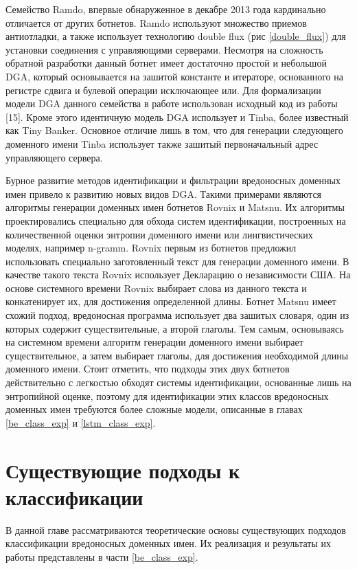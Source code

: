 Семейство Ramdo, впервые обнаруженное в декабре 2013 года кардинально отличается от других ботнетов. Ramdo используют множество приемов антиотладки, а также использует технологию double flux (рис \ref{double_flux}) для установки соединения с управляющими серверами. Несмотря на сложность обратной разработки данный ботнет имеет достаточно простой и небольшой DGA, который основывается на зашитой константе и итераторе, основанного на регистре сдвига и булевой операции исключающее или. Для формализации модели DGA данного семейства в работе использован исходный код из работы [15]. Кроме этого идентичную модель DGA использует и Tinba, более известный как Tiny Banker.  Основное отличие лишь в том, что для генерации следующего доменного имени Tinba использует также зашитый первоначальный адрес управляющего сервера.

Бурное развитие методов идентификации и фильтрации вредоносных доменных имен привело к развитию новых видов DGA. Такими примерами являются алгоритмы генерации доменных имен ботнетов Rovnix и Matsnu. Их алгоритмы проектировались специально для обхода систем идентификации, построенных на количественной оценки энтропии доменного имени или лингвистических моделях, например n-gramm. Rovnix первым из ботнетов предложил использовать специально заготовленный текст для генерации доменного имени. В качестве такого текста Rovnix использует Декларацию о независимости США. На основе системного времени Rovnix выбирает слова из данного текста и конкатенирует их, для достижения определенной длины. Ботнет Matsnu имеет схожий подход, вредоносная программа использует два зашитых словаря, один из которых содержит существительные, а второй глаголы. Тем самым, основываясь на системном времени алгоритм генерации доменного имени выбирает существительное, а затем выбирает глаголы, для достижения необходимой длины доменного имени. Стоит отметить, что подходы этих двух ботнетов действительно с легкостью обходят системы идентификации, основанные лишь на энтропийной оценке, поэтому для идентификации этих классов вредоносных доменных имен требуются более сложные модели, описанные в главах \ref{be_class_exp} и \ref{lstm_class_exp}.
\clearpage

\section{Существующие подходы к классификации}\label{be_class}
В данной главе рассматриваются теоретические основы существующих подходов классификации вредоносных доменных имен. Их реализация и результаты их работы представлены в части \ref{be_class_exp}.
